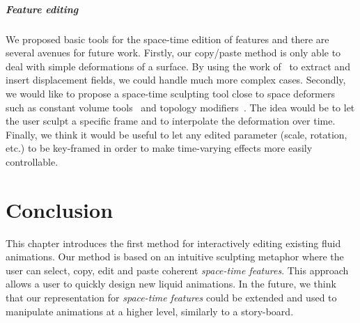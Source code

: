 \subparagraph{Feature editing} 
We proposed basic tools for the space-time edition of features and there are several avenues for future work. 
Firstly, our copy/paste method is only able to deal with simple deformations of a surface. 
By using the work of~\cite{Takahashi2003} to extract and insert displacement fields, we could handle much more complex cases. 
Secondly, we would like to propose a space-time sculpting tool close to space deformers such as constant volume tools~\cite{Angelidis2006b,funk2006vector} and topology modifiers~\cite{stanculescu2011freestyle}. 
The idea would be to let the user sculpt a specific frame and to interpolate the deformation over time. 
Finally, we think it would be useful to let any edited parameter (scale, rotation, etc.) to be key-framed in order to make time-varying effects more easily controllable.

\section{Conclusion} \label{sec:conclusion}

This chapter introduces the first method for interactively editing existing fluid animations.
Our method is based on an intuitive sculpting metaphor where the user can select, copy, edit and paste coherent \emph{space-time features}. 
This approach allows a user to quickly design new liquid animations. 
In the future, we think that our representation for \emph{space-time features} could be extended and used to manipulate animations at a higher level, similarly to a story-board. 


